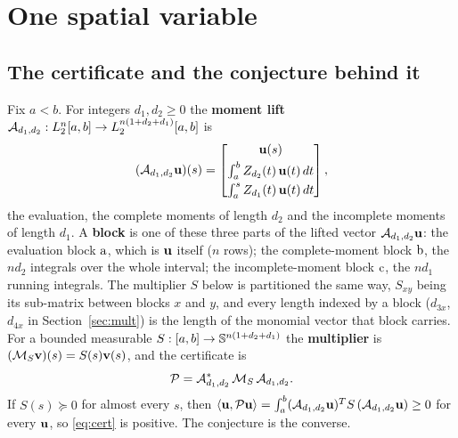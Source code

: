 \section{One spatial variable}\label{sec:1d}

\subsection{The certificate and the conjecture behind it}

Fix $a<b$. For integers $d_1,d_2\ge0$ the \textbf{moment lift} $\mathcal{A}_{d_1,d_2}:L_2^n[a,b]\to L_2^{n(1+d_2+d_1)}[a,b]$ is
\begin{equation}\label{eq:lift}
(\mathcal{A}_{d_1,d_2}\mathbf{u})(s)=\begin{bmatrix} \mathbf{u}(s)\\[3pt] \int_a^b Z_{d_2}(t)\,\mathbf{u}(t)\,dt\\[3pt] \int_a^s Z_{d_1}(t)\,\mathbf{u}(t)\,dt \end{bmatrix},
\end{equation}
the evaluation, the complete moments of length $d_2$ and the incomplete moments of length $d_1$. A \textbf{block} is one of these three parts of the lifted vector $\mathcal{A}_{d_1,d_2}\mathbf{u}$: the evaluation block $\mathrm{a}$, which is $\mathbf{u}$ itself ($n$ rows); the complete-moment block $\mathrm{b}$, the $nd_2$ integrals over the whole interval; the incomplete-moment block $\mathrm{c}$, the $nd_1$ running integrals. The multiplier $S$ below is partitioned the same way, $S_{xy}$ being its sub-matrix between blocks $x$ and $y$, and every length indexed by a block ($d_{3x}$, $d_{4x}$ in Section~\ref{sec:mult}) is the length of the monomial vector that block carries. For a bounded measurable $S:[a,b]\to\mathbb{S}^{n(1+d_2+d_1)}$ the \textbf{multiplier} is $(\mathcal{M}_S\mathbf{v})(s)=S(s)\mathbf{v}(s)$, and the certificate is
\begin{equation}\label{eq:cert}
\mathcal{P}=\mathcal{A}_{d_1,d_2}^*\,\mathcal{M}_S\,\mathcal{A}_{d_1,d_2}.
\end{equation}
If $S(s)\succeq0$ for almost every $s$, then $\left\langle \mathbf{u},\mathcal{P}\mathbf{u}\right\rangle=\int_a^b(\mathcal{A}_{d_1,d_2}\mathbf{u})^TS\,(\mathcal{A}_{d_1,d_2}\mathbf{u})\ge0$ for every $\mathbf{u}$, so \eqref{eq:cert} is positive. The conjecture is the converse.

